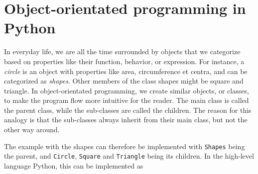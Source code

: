 \section{Object-orientated programming in Python}
In everyday life, we are all the time surrounded by objects that we categorize based on properties like their function, behavior, or expression. For instance, a \textit{circle} is an object with properties like area, circumference et centra, and can be categorized as \textit{shapes}. Other members of the class shapes might be square and triangle. In object-orientated programming, we create similar objects, or classes, to make the program flow more intuitive for the reader. The main class is called the parent class, while the sub-classes are called the children. The reason for this analogy is that the sub-classes always inherit from their main class, but not the other way around. 

The example with the shapes can therefore be implemented with \texttt{Shapes} being the parent, and \texttt{Circle}, \texttt{Square} and \texttt{Triangle} being its children. In the high-level language Python, this can be implemented as 

